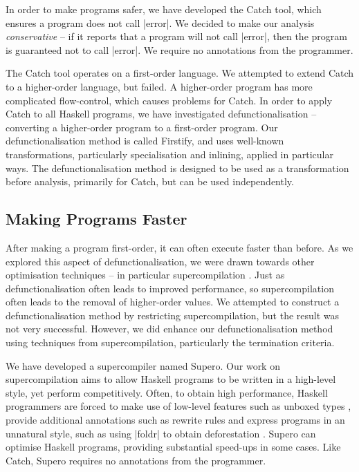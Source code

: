 In order to make programs safer, we have developed the Catch tool, which ensures a program does not call |error|. We decided to make our analysis \textit{conservative} -- if it reports that a program will not call |error|, then the program is guaranteed not to call |error|. We require no annotations from the programmer.

The Catch tool operates on a first-order language. We attempted to extend Catch to a higher-order language, but failed. A higher-order program has more complicated flow-control, which causes problems for Catch. In order to apply Catch to all Haskell programs, we have investigated defunctionalisation -- converting a higher-order program to a first-order program. Our defunctionalisation method is called Firstify, and uses well-known transformations, particularly specialisation and inlining, applied in particular ways. The defunctionalisation method is designed to be used as a transformation before analysis, primarily for Catch, but can be used independently.

\subsection{Making Programs Faster}

After making a program first-order, it can often execute faster than before. As we explored this aspect of defunctionalisation, we were drawn towards other optimisation techniques -- in particular supercompilation \cite{supercompilation}. Just as defunctionalisation often leads to improved performance, so supercompilation often leads to the removal of higher-order values. We attempted to construct a defunctionalisation method by restricting supercompilation, but the result was not very successful. However, we did enhance our defunctionalisation method using techniques from supercompilation, particularly the termination criteria.

We have developed a supercompiler named Supero. Our work on supercompilation aims to allow Haskell programs to be written in a high-level style, yet perform competitively. Often, to obtain high performance, Haskell programmers are forced to make use of low-level features such as unboxed types \cite{spj:unboxing}, provide additional annotations such as rewrite rules \cite{spj:rules} and express programs in an unnatural style, such as using |foldr| to obtain deforestation \cite{gill:shortcut_deforestation}. Supero can optimise Haskell programs, providing substantial speed-ups in some cases. Like Catch, Supero requires no annotations from the programmer.

